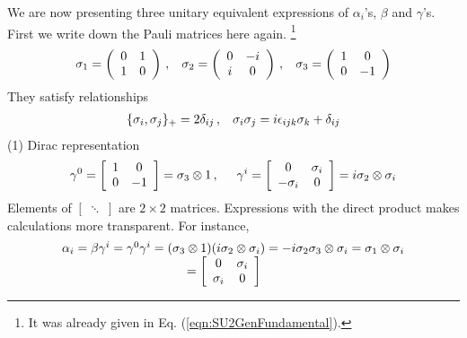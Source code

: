 We are now presenting three unitary equivalent expressions of $\alpha_i$'s, $\beta$ and $\gamma$'s.
First we write down the Pauli matrices here again.
\footnote{%
It was already given in Eq. (\ref{eqn:SU2GenFundamental}).
}%
\begin{eqnarray}
\sigma_1 =
\left(
\begin{array}{cc}
0 & 1 \\ 1 & 0
\end{array}
\right)\,,
\hspace{3mm}
\sigma_2 =
\left(
\begin{array}{cc}
0 & -i \\ i & 0
\end{array}
\right)\,,
\hspace{3mm}
\sigma_3 =
\left(
\begin{array}{cc}
1 &  0\\ 0 & -1
\end{array}
\right)
\end{eqnarray}
They satisfy relationships
\begin{eqnarray}
\{
\sigma_i, \sigma_j \}_+ = 2 \delta_{ij}\,,
\hspace{3mm}
\sigma_i \sigma_j = i\epsilon_{ijk} \sigma_k + \delta_{ij}
\end{eqnarray}
(1) Dirac representation\\
\begin{eqnarray}
\gamma^0
=
\left[
\begin{array}{cc}
1 & 0 \\ 0 & -1
\end{array}
\right]
= \sigma_3 \otimes 1
\,,
\hspace{5mm}
\gamma^i
=
\left[
\begin{array}{cc}
0 & \sigma_i \\ -\sigma_i & 0
\end{array}
\right]
=
i\sigma_2 \otimes \sigma_i
\end{eqnarray}
Elements of $\left[\;\ddots\;\right]$ are $2 \times 2$ matrices.
Expressions with the direct product makes calculations more transparent. 
For instance,
\begin{eqnarray}
\begin{array}{l}
\alpha_i = \beta \gamma^i = \gamma^0 \gamma^i
= (\sigma_3 \otimes 1)(i\sigma_2 \otimes \sigma_i)
= -i \sigma_2 \sigma_3 \otimes \sigma_i
= \sigma_1 \otimes \sigma_i
\\
\hspace{35mm}
=
\left[
\begin{array}{cc}
0 & \sigma_i
\\
\sigma_i & 0
\end{array}
\right]
\end{array}
\end{eqnarray}
